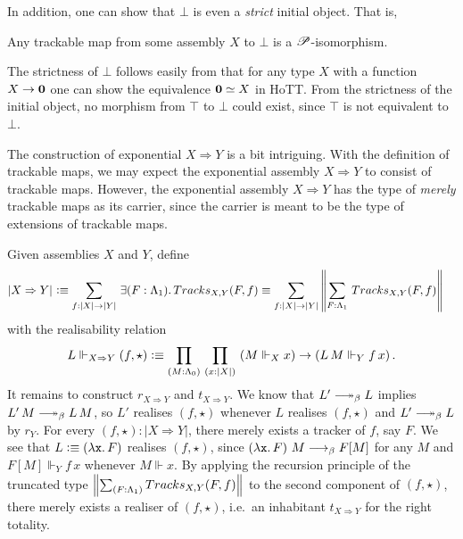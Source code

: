 \documentclass[a4paper,UKenglish,numberwithinsect,cleveref,thm-restate]{lipics-v2021}
\numberwithin{equation}{section}
\theoremstyle{plain}
\begin{document}
In addition, one can show that $\bot$ is even a \emph{strict} initial object. That is, 
\begin{proposition}\label{prop:strict-initial}
  Any trackable map from some assembly $X$ to $\bot$ is a $\mathscr{P}$-isomorphism. 
\end{proposition}
The strictness of $\bot$ follows easily from that for any type $X$ with a function $X \to \mathbf{0}$ one can show the equivalence $\mathbf{0} \simeq X$ in HoTT.
From the strictness of the initial object, no morphism from $\top$ to $\bot$ could exist, since $\top$ is not equivalent to $\bot$.

The construction of exponential $X \Rightarrow Y$ is a bit intriguing.
With the definition of trackable maps, we may expect the exponential assembly $X \Rightarrow Y$ to consist of trackable maps.
However, the exponential assembly $X \Rightarrow Y$ has the type of \emph{merely} trackable maps as its carrier, since the carrier is meant to be the type of extensions of trackable maps.
\begin{example}[Exponential]
  Given assemblies $X$ and $Y$, define
  \begin{align*}
    \bproj{X \Rightarrow Y} & \defeq \sm{f : |X| \to |Y|} \exis{F : \Lambda_1} \mathsf{Tracks}_{X, Y}(F, f) \equiv \sm{f : |X| \to |Y|} \brck{\sm{F : \Lambda_1} \mathsf{Tracks}_{X, Y}(F, f) }
  \end{align*}
  with the realisability relation 
  \[
    L \Vdash_{X \Rightarrow Y} (f, \star) \defeq \prd{M : \Lambda_0}{x : |X|} \left( M \Vdash_X x\right) \to \left(L\,M \Vdash_Y f\,x\right).
  \]
  It remains to construct $r_{X\Rightarrow Y}$ and $t_{X \Rightarrow Y}$. 
  We know that $L' \reduce L$ implies $L'\,M \reduce L\,M$, so $L'$ realises $(f, \star)$ whenever $L$ realises $(f, \star)$ and $L' \reduce L$ by $r_Y$.
  For every $(f, \star) : |X \Rightarrow Y|$, there merely exists a tracker of $f$, say $F$.
  We see that $L \vcentcolon\equiv \left(\mathtt{\lambda x}.\,F\right)$ realises $(f, \star)$, since
  $\left(\mathtt{\lambda x}.\,F\right)\,M \longrightarrow_{\beta} F[M]$ for any $M$ and $F[M] \Vdash_Y f\,x$ whenever $M \Vdash x$.
  By applying the recursion principle of the truncated type $\brck{\sm{F : \Lambda_1} \mathsf{Tracks}_{X, Y}(F, f) }$ to the second component of $(f, \star)$, there merely exists a realiser of $(f, \star)$, i.e.\ an inhabitant $t_{X \Rightarrow Y}$ for the right totality.

\end{example}
\end{document}
